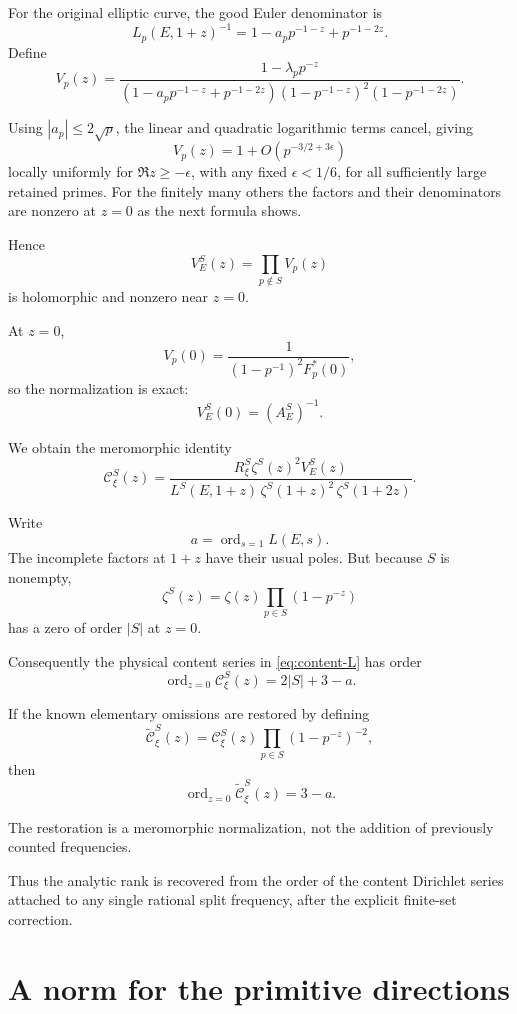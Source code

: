 \documentclass[11pt]{article}
\begin{document}
For the original elliptic curve, the good
Euler denominator is
\[
L_p(E,1+z)^{-1}
=
1-a_pp^{-1-z}+p^{-1-2z}.
\]
Define
\[
V_p(z)=
\frac{1-\lambda_pp^{-z}}
{(1-a_pp^{-1-z}+p^{-1-2z})
 (1-p^{-1-z})^2(1-p^{-1-2z})}.
\]

Using $|a_p|\le2\sqrt p$,
the linear and quadratic logarithmic
terms cancel, giving
\[
V_p(z)=1+O(p^{-3/2+3\epsilon})
\]
locally uniformly for $\Re z\ge-\epsilon$,
with any fixed $\epsilon<1/6$,
for all sufficiently large retained primes. For the finitely many others
the factors and their denominators are nonzero at $z=0$ as the next
formula shows.

Hence
\[
V_E^S(z)=\prod_{p\notin S}V_p(z)
\]
is holomorphic and nonzero near $z=0$.

At $z=0$,
\[
V_p(0)
=
\frac1{(1-p^{-1})^2F_p^*(0)},
\]
so the normalization is exact:
\[
\boxed{V_E^S(0)=(A_E^S)^{-1}.}
\]

We obtain the meromorphic identity
\begin{equation}\label{eq:content-L}
\boxed{
\mathcal C_\xi^S(z)=
\frac{
R_\xi^S\zeta^S(z)^2V_E^S(z)}
{
L^S(E,1+z)\,
\zeta^S(1+z)^2\,
\zeta^S(1+2z)
}.
}
\end{equation}

Write
\[
a=\operatorname{ord}_{s=1}L(E,s).
\]
The incomplete factors at $1+z$
have their usual poles.
But because $S$ is nonempty,
\[
\zeta^S(z)
=
\zeta(z)\prod_{p\in S}(1-p^{-z})
\]
has a zero of order $|S|$ at $z=0$.

Consequently the physical content series
in \eqref{eq:content-L} has order
\[
\boxed{
\operatorname{ord}_{z=0}
\mathcal C_\xi^S(z)=2|S|+3-a.
}
\]

If the known elementary omissions are
restored by defining
\[
\widetilde{\mathcal C}_\xi^S(z)
=
\mathcal C_\xi^S(z)
\prod_{p\in S}(1-p^{-z})^{-2},
\]
then
\begin{equation}\label{eq:analytic-order}
\boxed{
\operatorname{ord}_{z=0}
\widetilde{\mathcal C}_\xi^S(z)=3-a.
}
\end{equation}

The restoration is a meromorphic
normalization, not the addition of
previously counted frequencies.

Thus the analytic rank is recovered from
the order of the content Dirichlet series
attached to any single rational split
frequency, after the explicit finite-set
correction.

\section{A norm for the primitive directions}
\end{document}
